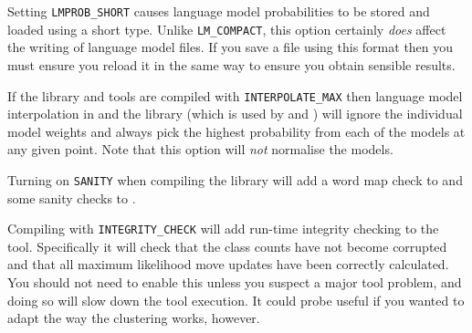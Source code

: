 
Setting {\tt LMPROB\_SHORT} causes language model probabilities to be
stored and loaded using a short type.  Unlike {\tt LM\_COMPACT}, this
option certainly {\it does} affect the writing of language model
files.  If you save a file using this format then you must ensure you
reload it in the same way to ensure you obtain sensible results.



If the library and tools are compiled with {\tt INTERPOLATE\_MAX} then
language model interpolation in  and the 
library (which is used by  and ) will
ignore the individual model weights and always pick the highest
probability from each of the models at any given point.  Note that
this option will \textit{not} normalise the models.



Turning on {\tt SANITY} when compiling the library will add a word map
check to  and some sanity checks to .



Compiling with {\tt INTEGRITY\_CHECK} will add run-time integrity
checking to the  tool.  Specifically it will check that
the class counts have not become corrupted and that all maximum
likelihood move updates have been correctly calculated.  You should
not need to enable this unless you suspect a major tool problem, and
doing so will slow down the tool execution.  It could probe useful if
you wanted to adapt the way the clustering works, however.
